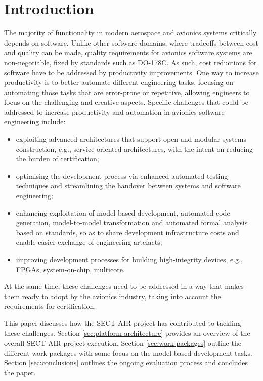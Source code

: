 \section{Introduction}
\label{sec:introduction}

The majority of functionality in modern aerospace and avionics systems critically depends on software. Unlike other software domains, where tradeoffs between cost and quality can be made, quality requirements for avionics software systems are non-negotiable, fixed by standards such as DO-178C. As such, cost reductions for software have to be addressed by productivity improvements. One way to increase productivity is to better automate different engineering tasks, focusing on automating those tasks that are error-prone or repetitive, allowing engineers to focus on the challenging and creative aspects. Specific challenges that could be addressed to increase productivity and automation in avionics software engineering include:
\begin{itemize}
\item exploiting advanced architectures that support open and modular systems construction, e.g., service-oriented architectures, with the intent on reducing the burden of certification;
\item optimising the development process via enhanced automated testing techniques and streamlining the handover between systems and software engineering;
\item enhancing exploitation of model-based development, automated code generation, model-to-model transformation and automated formal analysis based on standards, so as to share development infrastructure costs and enable easier exchange of engineering artefacts;
\item improving development processes for building high-integrity devices, e.g., FPGAs, system-on-chip, multicore.
\end{itemize}
At the same time, these challenges need to be addressed in a way that makes them ready to adopt by the avionics industry, taking into account the requirements for certification.

This paper discusses how the SECT-AIR project has contributed to tackling these challenges. 
Section \ref{sec:platform-architecture} provides an overview of the overall SECT-AIR project execution. Section \ref{sec:work-packages} outline the different work packages with some focus on the model-based development tasks. Section \ref{sec:conclusions} outlines the ongoing evaluation process and concludes the paper.

